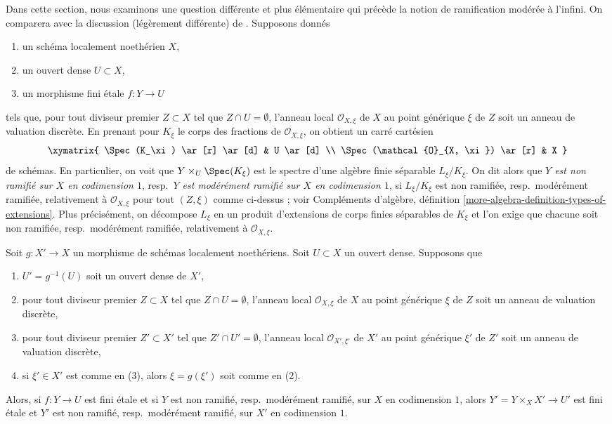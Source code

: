 \medskip\noindent
Dans cette section, nous examinons une question différente et plus élémentaire qui
précède la notion de ramification modérée à l'infini.
On comparera avec la discussion (légèrement différente)
de \cite{Grothendieck-Murre}.
Supposons donnés
\begin{enumerate}
\item un schéma localement noethérien $X$,
\item un ouvert dense $U \subset X$,
\item un morphisme fini \'etale $f : Y \to U$
\end{enumerate}
tels que, pour tout diviseur premier $Z \subset X$
tel que $Z \cap U = \emptyset$, l'anneau local $\mathcal{O}_{X, \xi}$
de $X$ au point générique $\xi$ de $Z$ soit un anneau de valuation discrète.
En prenant pour $K_\xi$ le corps des fractions de $\mathcal{O}_{X, \xi}$,
on obtient un carré cartésien
$$
\xymatrix{
\Spec(K_\xi) \ar[r] \ar[d] & U \ar[d] \\
\Spec(\mathcal{O}_{X, \xi}) \ar[r] & X
}
$$
de schémas. En particulier, on voit que $Y \times_U \Spec(K_\xi)$
est le spectre d'une algèbre finie séparable $L_\xi/K_\xi$.
On dit alors que
{\it $Y$ est non ramifié sur $X$ en codimension $1$},
resp.\ {\it $Y$ est modérément ramifié sur $X$ en codimension $1$},
si $L_\xi/K_\xi$ est non ramifiée, resp.\ modérément ramifiée,
relativement à $\mathcal{O}_{X, \xi}$ pour tout $(Z, \xi)$
comme ci-dessus ; voir Compléments d'algèbre, définition
\ref{more-algebra-definition-types-of-extensions}.
Plus précisément, on décompose $L_\xi$ en un produit d'extensions
de corps finies séparables de $K_\xi$ et l'on exige que chacune soit
non ramifiée, resp.\ modérément ramifiée, relativement à
$\mathcal{O}_{X, \xi}$.

\begin{lemma}
\label{lemma-pullback-tame-codim1}
Soit $g : X' \to X$ un morphisme de schémas localement noethériens.
Soit $U \subset X$ un ouvert dense. Supposons que
\begin{enumerate}
\item $U' = g^{-1}(U)$ soit un ouvert dense de $X'$,
\item pour tout diviseur premier $Z \subset X$ tel que $Z \cap U = \emptyset$,
l'anneau local $\mathcal{O}_{X, \xi}$ de $X$ au point générique $\xi$
de $Z$ soit un anneau de valuation discrète,
\item pour tout diviseur premier $Z' \subset X'$
tel que $Z' \cap U' = \emptyset$, l'anneau local $\mathcal{O}_{X', \xi'}$
de $X'$ au point générique $\xi'$ de $Z'$ soit un anneau de valuation discrète,
\item si $\xi' \in X'$ est comme en (3), alors $\xi = g(\xi')$ soit comme en (2).
\end{enumerate}
Alors, si $f : Y \to U$ est fini \'etale et si
$Y$ est non ramifié, resp.\ modérément ramifié, sur $X$
en codimension $1$, alors $Y' = Y \times_X X' \to U'$ est fini \'etale
et $Y'$ est non ramifié, resp.\ modérément ramifié, sur $X'$ en codimension $1$.
\end{lemma}

